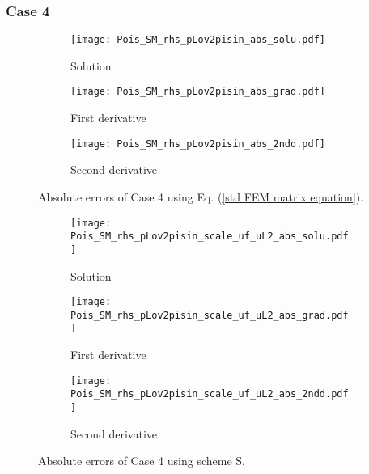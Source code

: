 \documentclass[final,3p]{elsarticle}
\begin{document}
\pagebreak
\subsubsection{Case 4}

\begin{figure}[!ht]
    \begin{subfigure}{5.5cm}
        \texttt{[image: Pois\_SM\_rhs\_pLov2pisin\_abs\_solu.pdf]}
        \caption{Solution}
        \label{Fig:Pois_SM_rhs_pLov2pisin_abs_solu}
    \end{subfigure}
    \begin{subfigure}{5.5cm}
        \texttt{[image: Pois\_SM\_rhs\_pLov2pisin\_abs\_grad.pdf]}
        \caption{First derivative}
        \label{Fig:Pois_SM_rhs_pLov2pisin_abs_grad}
    \end{subfigure}
    \begin{subfigure}{5.5cm}
        \texttt{[image: Pois\_SM\_rhs\_pLov2pisin\_abs\_2ndd.pdf]}
        \caption{Second derivative}
        \label{Fig:Pois_SM_rhs_pLov2pisin_abs_2ndd}
    \end{subfigure}
\caption{Absolute errors of Case 4 using Eq. (\ref{std FEM matrix equation}).}
\label{Pois_SM_rhs_pLov2pisin_abs}
\end{figure}

\begin{figure}[!ht]
    \begin{subfigure}{5.5cm}
        \texttt{[image: Pois\_SM\_rhs\_pLov2pisin\_scale\_uf\_uL2\_abs\_solu.pdf]}
        \caption{Solution}
        \label{Fig:Pois_SM_rhs_pLov2pisin_scale_uf_uL2_abs_solu}
    \end{subfigure}
    \begin{subfigure}{5.5cm}
        \texttt{[image: Pois\_SM\_rhs\_pLov2pisin\_scale\_uf\_uL2\_abs\_grad.pdf]}
        \caption{First derivative}
        \label{Fig:Pois_SM_rhs_pLov2pisin_scale_uf_uL2_abs_grad}
    \end{subfigure}
    \begin{subfigure}{5.5cm}
        \texttt{[image: Pois\_SM\_rhs\_pLov2pisin\_scale\_uf\_uL2\_abs\_2ndd.pdf]}
        \caption{Second derivative}
        \label{Fig:Pois_SM_rhs_pLov2pisin_scale_uf_uL2_abs_2ndd}
    \end{subfigure}
\caption{Absolute errors of Case 4 using scheme $\text{S}$.}
\label{Pois_SM_rhs_pLov2pisin_scale_uf_uL2_abs}
\end{figure}
\end{document}
